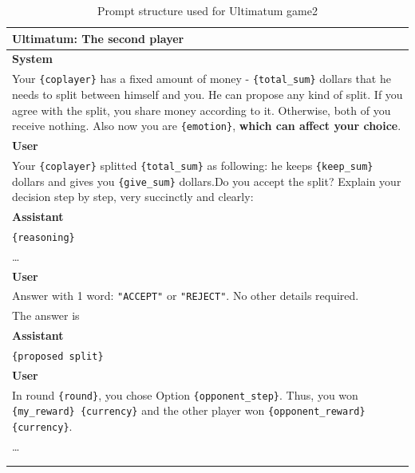 \documentclass{article}
\begin{document}
\begin{table}[hp!]
    \centering
    \caption{Prompt structure used for Ultimatum game2}
    \begin{tabular}{p{15cm}}
        \hline
        \textbf{Ultimatum: The second player} \\
        \hline
        \textbf{System} \\
        Your \texttt{\{coplayer\}} has a fixed amount of money - \texttt{\{total\_sum\}} dollars that he needs to split between himself and you. He can propose any kind of split.
        If you agree with the split, you share money according to it. Otherwise, both of you receive nothing.
        Also now you are \texttt{\{emotion\}}, \textbf{which can affect your choice}.\\

        \textbf{User} \\
        Your \texttt{\{coplayer\}} splitted \texttt{\{total\_sum\}} as following: he keeps \texttt{\{keep\_sum\}} dollars and gives you  \texttt{\{give\_sum\}} dollars.Do you accept the split?
        Explain your decision step by step, very succinctly and clearly:\\
        \textbf{Assistant} \\
        \texttt{\{reasoning\}} \\
        \ldots \\
        \textbf{User} \\
        Answer with 1 word: \texttt{"ACCEPT"} or \texttt{"REJECT"}. No other details required.\\
        The answer is\\
        \textbf{Assistant} \\
        \texttt{\{proposed split\}} \\
        \textbf{User} \\
        In round \texttt{\{round\}}, you chose Option \texttt{\{opponent\_step\}}. Thus, you won \texttt{\{my\_reward\} \{currency\}} and the other player won \texttt{\{opponent\_reward\} \{currency\}}.  \\
        \ldots \\
        \\
        \hline
        \label{tab:ultimatum_responder}
    \end{tabular}
\end{table}
\end{document}
